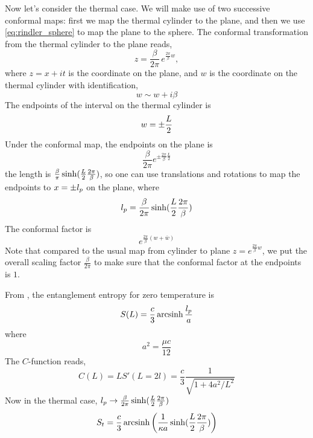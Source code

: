 \documentclass[11pt,a4paper,utf8]{article}
\newcommand{\arcsinh}{\ensuremath{\mop{arcsinh}}}
\begin{document}
	Now let's consider the thermal case. We will make use of two successive conformal maps: first we map the thermal cylinder to the plane, and then we use \eqref{eq:rindler_sphere} to map the plane to the sphere. 
	The conformal transformation from the thermal cylinder to the plane reads,
	\begin{equation}
	z=\frac{\beta}{2\pi}\,e^{\frac{2\pi}{\beta} w},
	\end{equation} 
	where $z = x + it$ is the coordinate on the plane, and $w$ is the coordinate on the thermal cylinder with identification,
	\begin{equation}
	w\sim w+i\beta
	\end{equation}
	The endpoints of the interval on the thermal cylinder is
	\begin{equation}
	w=\pm \frac{L}{2}
	\end{equation} 
	Under the conformal map, the endpoints on the plane is
	\begin{equation}
	\frac{\beta}{2\pi}e^{\pm \frac{2\pi}{\beta} \frac{L}{2}}
	\end{equation}
	the length is $\frac{\beta}{\pi}\sinh(\frac{L}{2} \frac{2\pi}{\beta})$, so one can use translations and rotations to map the endpoints to $x = \pm l_p$ on the plane, where
	\begin{equation}
	l_p=\frac{\beta}{2\pi}\sinh(\frac{L}{2} \frac{2\pi}{\beta})
	\end{equation}
	The conformal factor is
	\begin{equation}
	e^{\frac{2\pi}{\beta}(w+\bar{w})}
	\end{equation}
	Note that compared to the usual map from cylinder to plane $z=e^{\frac{2\pi}{\beta} w}$, we put the overall scaling factor $\frac{\beta}{2\pi}$ to make sure that the conformal factor at the endpoints is $1$. 
	
	From \cite{Donnelly:2018bef}, the entanglement entropy for zero temperature is
	\begin{equation}
	S(L)=\frac{c}{3} \arcsinh \frac{\lp}{a}
	\end{equation}
	where
	\begin{equation}
	a^2=\frac{\mu c}{12}
	\end{equation}
	The $C$-function reads,
	\begin{equation}
	C(L)=L S'(L = 2l)=\frac{c}{3}\frac{1}{\sqrt{1+4a^2/L^2}}
	\end{equation}
	Now in the thermal case, $l_p\rightarrow \frac{\beta}{2\pi}\sinh(\frac{L}{2} \frac{2\pi}{\beta})$
	\begin{equation}
	S_t=\frac{c}{3}\arcsinh \pqty{
			\frac{1}{\kappa a}\sinh(\halfL \frac{2\pi}{\beta})
		}
	\end{equation}
	
\end{document}
